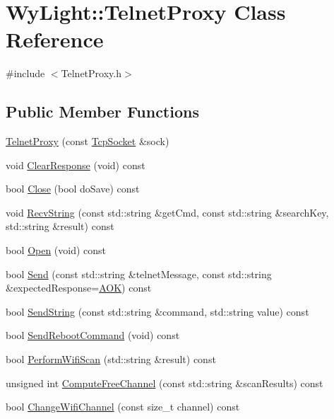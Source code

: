 \hypertarget{class_wy_light_1_1_telnet_proxy}{\section{Wy\-Light\-:\-:Telnet\-Proxy Class Reference}
\label{class_wy_light_1_1_telnet_proxy}
}


{\ttfamily \#include $<$Telnet\-Proxy.\-h$>$}

\subsection*{Public Member Functions}
\begin{DoxyCompactItemize}
\item 
\hyperlink{class_wy_light_1_1_telnet_proxy_a0d14c061adc13dd7f2f6d2b2bdbd700e}{Telnet\-Proxy} (const \hyperlink{class_wy_light_1_1_tcp_socket}{Tcp\-Socket} \&sock)
\item 
void \hyperlink{class_wy_light_1_1_telnet_proxy_ab438600992c7087b8bc8ec4248e4e9c1}{Clear\-Response} (void) const 
\item 
bool \hyperlink{class_wy_light_1_1_telnet_proxy_a21253eaad73040a3c23b4a234a1e4a7c}{Close} (bool do\-Save) const 
\item 
void \hyperlink{class_wy_light_1_1_telnet_proxy_ac4a01d35a096c4289467ae20c8e98909}{Recv\-String} (const std\-::string \&get\-Cmd, const std\-::string \&search\-Key, std\-::string \&result) const 
\item 
bool \hyperlink{class_wy_light_1_1_telnet_proxy_a296f650c20d7f577cef397cb5a558898}{Open} (void) const 
\item 
bool \hyperlink{class_wy_light_1_1_telnet_proxy_a5ac27544d8fde1b3c4c49a09ec2ce356}{Send} (const std\-::string \&telnet\-Message, const std\-::string \&expected\-Response=\hyperlink{_telnet_proxy_8h_a2139cfcd9b3c7af8c0246e72ca4ae807}{A\-O\-K}) const 
\item 
bool \hyperlink{class_wy_light_1_1_telnet_proxy_a2db92c2c87d880c90f7e48514e3bdb61}{Send\-String} (const std\-::string \&command, std\-::string value) const 
\item 
bool \hyperlink{class_wy_light_1_1_telnet_proxy_a92900b6d84df1080f9cb6cc5ae854a72}{Send\-Reboot\-Command} (void) const 
\item 
bool \hyperlink{class_wy_light_1_1_telnet_proxy_aae62f9bb24e292b0ad6afefbe2eafd77}{Perform\-Wifi\-Scan} (std\-::string \&result) const 
\item 
unsigned int \hyperlink{class_wy_light_1_1_telnet_proxy_a557df99e3968f7a86b0dbef55a6c6c72}{Compute\-Free\-Channel} (const std\-::string \&scan\-Results) const 
\item 
bool \hyperlink{class_wy_light_1_1_telnet_proxy_a0a454e69ec789b2d63faea69f480761c}{Change\-Wifi\-Channel} (const size\-\_\-t channel) const 
\end{DoxyCompactItemize}
